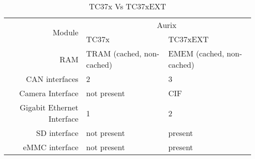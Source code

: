
\begin{table}[htbp]
  \centering
    \begin{tabular}{|r||l|l|}
	\hline
	\multirow{2}{*}{Module} & \multicolumn{2}{c|}{Aurix}\\
	\cline{2-3}
	& TC37x & TC37xEXT \\
	\hline \hline
	    RAM & TRAM (cached, non-cached) & EMEM (cached, non-cached) \\
	    \hline
	    CAN interfaces & 2 & 3 \\
	    \hline
	    Camera Interface & not present & CIF \\
	    \hline
	    Gigabit Ethernet Interface & 1 & 2 \\
	    \hline
	    SD interface & not present & present \\
	    \hline
	    eMMC interface & not present & present \\
	    \hline
	\hline
    \end{tabular}
  \caption{TC37x Vs TC37xEXT}
  \label{tab:tc37x_delta}
\end{table}
